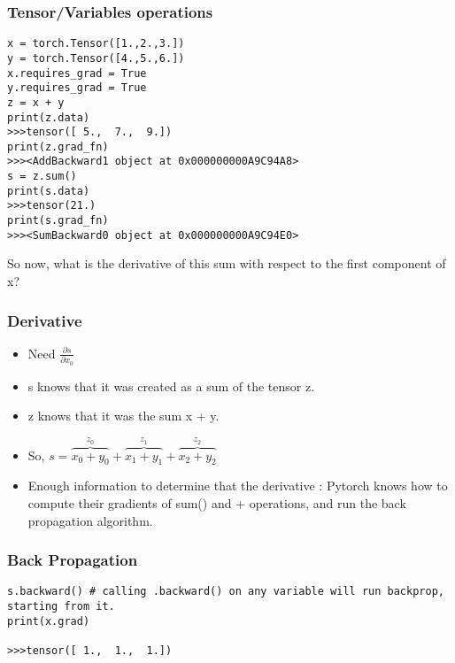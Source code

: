  
  
\begin{frame}[fragile]
\frametitle{Tensor/Variables operations}

 \begin{lstlisting}
x = torch.Tensor([1.,2.,3.])
y = torch.Tensor([4.,5.,6.])
x.requires_grad = True
y.requires_grad = True
z = x + y
print(z.data)
>>>tensor([ 5.,  7.,  9.])
print(z.grad_fn)
>>><AddBackward1 object at 0x000000000A9C94A8>
s = z.sum()
print(s.data)
>>>tensor(21.)
print(s.grad_fn)
>>><SumBackward0 object at 0x000000000A9C94E0>
 \end{lstlisting}
So now, what is the derivative of this sum with respect to the first component of x? 
 \end{frame} 
 
\begin{frame}[fragile]
\frametitle{Derivative}
\begin{itemize}
\item Need $\frac{\partial s}{\partial x_0}$
\item s knows that it was created as a sum of the tensor z. 
\item z knows that it was the sum x + y. 
\item So, $s = \overbrace{x_0 + y_0}^\text{$z_0$} + \overbrace{x_1 + y_1}^\text{$z_1$} + \overbrace{x_2 + y_2}^\text{$z_2$}$
\item Enough information to determine that the derivative : Pytorch knows how to compute their gradients of sum() and + operations, and run the back propagation algorithm. 
\end{itemize}


\end{frame} 
 
\begin{frame}[fragile]
\frametitle{Back Propagation}

 \begin{lstlisting}
s.backward() # calling .backward() on any variable will run backprop, starting from it.
print(x.grad)

>>>tensor([ 1.,  1.,  1.])
 \end{lstlisting}

\end{frame} 
 
